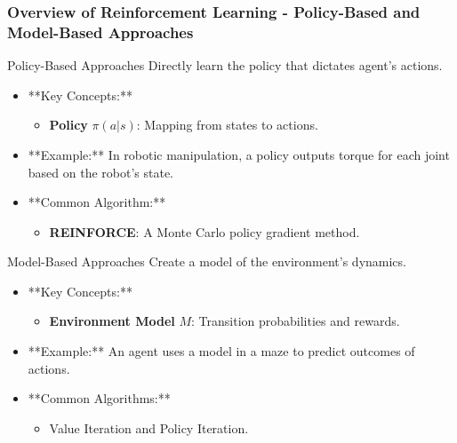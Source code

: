 \documentclass[aspectratio=169]{beamer}
\begin{document}
\begin{frame}[fragile]
    \frametitle{Overview of Reinforcement Learning - Policy-Based and Model-Based Approaches}
    \begin{block}{Policy-Based Approaches}
        Directly learn the policy that dictates agent's actions.
    \end{block}
    \begin{itemize}
        \item **Key Concepts:**
        \begin{itemize}
            \item \textbf{Policy} $\pi(a|s)$: Mapping from states to actions.
        \end{itemize}
        \item **Example:** 
        In robotic manipulation, a policy outputs torque for each joint based on the robot's state.
        \item **Common Algorithm:**
        \begin{itemize}
            \item \textbf{REINFORCE}: A Monte Carlo policy gradient method.
        \end{itemize}
    \end{itemize}

    \begin{block}{Model-Based Approaches}
        Create a model of the environment's dynamics.
    \end{block}
    \begin{itemize}
        \item **Key Concepts:**
        \begin{itemize}
            \item \textbf{Environment Model} $M$: Transition probabilities and rewards.
        \end{itemize}
        \item **Example:** 
        An agent uses a model in a maze to predict outcomes of actions.
        \item **Common Algorithms:**
        \begin{itemize}
            \item Value Iteration and Policy Iteration.
        \end{itemize}
    \end{itemize}
\end{frame}
\end{document}
